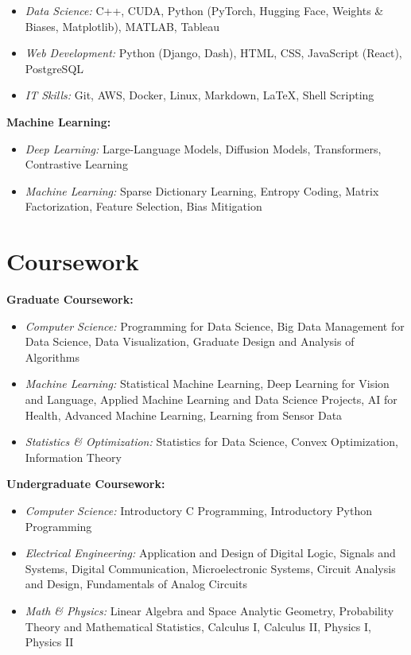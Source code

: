 \documentclass[11pt]{article}
\begin{document}
\begin{itemize}
    \item {\textit{Data Science:}} C++, CUDA, Python (PyTorch, Hugging Face, Weights \& Biases, Matplotlib), MATLAB, Tableau
    \item {\textit{Web Development:}} Python (Django, Dash), HTML, CSS, JavaScript (React), PostgreSQL
    \item {\textit{IT Skills:}} Git, AWS, Docker, Linux, Markdown, LaTeX, Shell Scripting
\end{itemize}

\vspace{\lineskip}

\textbf{Machine Learning:}

\begin{itemize}
    \item {\textit{Deep Learning:}} Large-Language Models, Diffusion Models, Transformers, Contrastive Learning
    \item {\textit{Machine Learning:}} Sparse Dictionary Learning, Entropy Coding, Matrix Factorization, Feature Selection, Bias Mitigation
\end{itemize}


\section*{Coursework}

\textbf{Graduate Coursework:}

\begin{itemize}
    \item {\textit{Computer Science:}} Programming for Data Science, Big Data Management for Data Science, Data Visualization, Graduate Design and Analysis of Algorithms
    \item {\textit{Machine Learning:}} Statistical Machine Learning, Deep Learning for Vision and Language, Applied Machine Learning and Data Science Projects, AI for Health, Advanced Machine Learning, Learning from Sensor Data
    \item {\textit{Statistics \& Optimization:}} Statistics for Data Science, Convex Optimization, Information Theory
\end{itemize}

\vspace{\lineskip}

\textbf{Undergraduate Coursework:}

\begin{itemize}
    \item {\textit{Computer Science:}} Introductory C Programming, Introductory Python Programming
    \item {\textit{Electrical Engineering:}} Application and Design of Digital Logic, Signals and Systems, Digital Communication, Microelectronic Systems, Circuit Analysis and Design, Fundamentals of Analog Circuits
    \item {\textit{Math \& Physics:}} Linear Algebra and Space Analytic Geometry, Probability Theory and Mathematical Statistics, Calculus I, Calculus II, Physics I, Physics II
\end{itemize}
\end{document}
